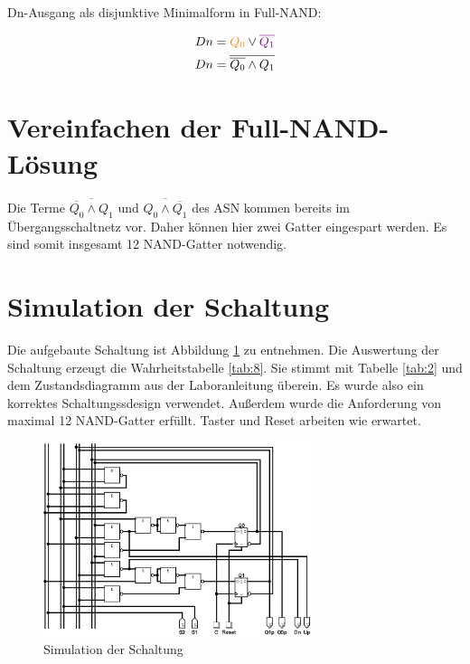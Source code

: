 \documentclass[
    paper=a4,
]{scrartcl}
\newcommand{\edit}[1]{\textcolor{colorred}{#1}}
\begin{document}
    Dn-Ausgang als disjunktive Minimalform in Full-NAND:

    \begin{align*}
        Dn &= \textcolor{orange}{Q_0} \vee \textcolor{violet}{\overline{Q_1}}\\
        Dn &= \overline{\overline{Q_0} \wedge Q_1}
    \end{align*}

\section{Vereinfachen der Full-NAND-Lösung}
    Die Terme \(\overline{\overline{Q_0} \wedge Q_1}\) und \(\overline{Q_0 \wedge \overline{Q_1}}\) des ASN kommen bereits im Übergangsschaltnetz vor. Daher können hier zwei Gatter eingespart werden. Es sind somit insgesamt 12 NAND-Gatter notwendig.

\section{Simulation der Schaltung}
    Die aufgebaute Schaltung ist Abbildung \ref{fig:1} zu entnehmen. Die Auswertung der Schaltung erzeugt die Wahrheitstabelle \ref{tab:8}. Sie stimmt mit Tabelle \ref{tab:2} und dem Zustandsdiagramm aus der Laboranleitung überein. Es wurde also ein korrektes Schaltungssdesign verwendet. Außerdem wurde die Anforderung \edit{von} maximal 12 NAND-Gatter erfüllt. \edit{Taster und Reset arbeiten wie erwartet.}

    \begin{figure}[bh]
        \centering
        \includegraphics[width=0.7\textwidth]{schaltung.png}
        \caption{Simulation der Schaltung}
        \label{fig:1}
    \end{figure}
\end{document}
